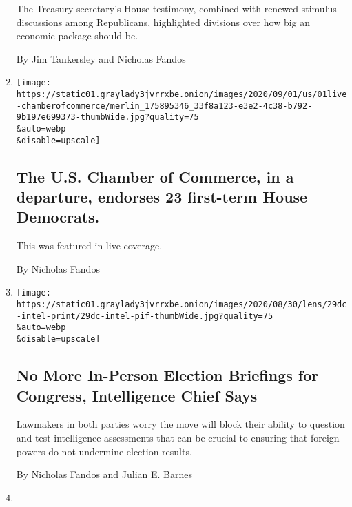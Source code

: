 \begin{enumerate}
  The Treasury secretary's House testimony, combined with renewed
  stimulus discussions among Republicans, highlighted divisions over how
  big an economic package should be.

  By Jim Tankersley and Nicholas Fandos
\item
  \href{/live/2020/09/01/us/trump-vs-biden/the-us-chamber-of-commerce-in-a-departure-endorses-23-first-term-house-democrats}{}

  \texttt{[image: https://static01.graylady3jvrrxbe.onion/images/2020/09/01/us/01live-chamberofcommerce/merlin\_175895346\_33f8a123-e3e2-4c38-b792-9b197e699373-thumbWide.jpg?quality=75\\\&auto=webp\\\&disable=upscale]}

  \hypertarget{the-us-chamber-of-commerce-in-a-departure-endorses-23-first-term-house-democrats}{%
  \subsection{The U.S. Chamber of Commerce, in a departure, endorses 23
  first-term House
  Democrats.}\label{the-us-chamber-of-commerce-in-a-departure-endorses-23-first-term-house-democrats}}

  This was featured in live coverage.

  By Nicholas Fandos
\item
  \href{/2020/08/29/us/politics/election-security-intelligence-briefings-congress.html}{}

  \texttt{[image: https://static01.graylady3jvrrxbe.onion/images/2020/08/30/lens/29dc-intel-print/29dc-intel-pif-thumbWide.jpg?quality=75\\\&auto=webp\\\&disable=upscale]}

  \hypertarget{no-more-in-person-election-briefings-for-congress-intelligence-chief-says}{%
  \subsection{No More In-Person Election Briefings for Congress,
  Intelligence Chief
  Says}\label{no-more-in-person-election-briefings-for-congress-intelligence-chief-says}}

  Lawmakers in both parties worry the move will block their ability to
  question and test intelligence assessments that can be crucial to
  ensuring that foreign powers do not undermine election results.

  By Nicholas Fandos and Julian E. Barnes
\item
  \href{/2020/08/28/us/senate-control-republican-convention-trump.html}{}


\end{enumerate}
